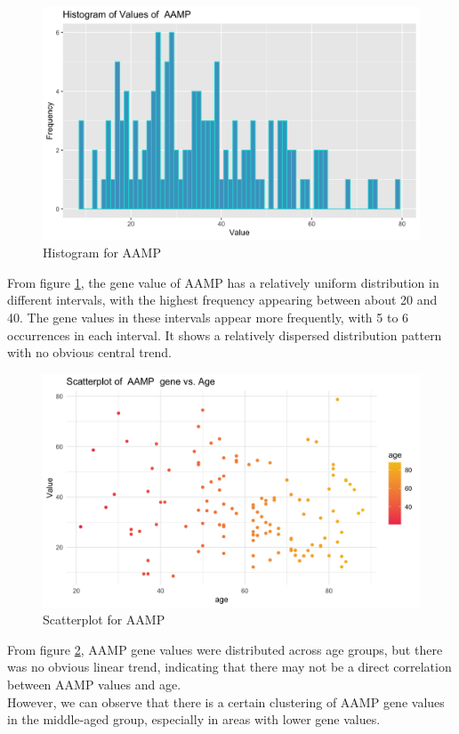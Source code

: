 \documentclass[a4paper, 12pt, one column]{article}
\begin{document}
\begin{figure}[H]
    \centering
    \includegraphics[width=1\textwidth]{hist.png}
    \caption{Histogram for AAMP}
    \label{hist}
\end{figure}
From figure \ref{hist}, the gene value of AAMP has a relatively uniform distribution in different intervals, with the highest frequency appearing between about 20 and 40. The gene values in these intervals appear more frequently, with 5 to 6 occurrences in each interval. It shows a relatively dispersed distribution pattern with no obvious central trend.

\begin{figure}[H]
    \centering
    \includegraphics[width=1\textwidth]{scatter.png} 
    \caption{Scatterplot for AAMP}
    \label{scatter}
\end{figure}
From figure \ref{scatter}, AAMP gene values were distributed across age groups, but there was no obvious linear trend, indicating that there may not be a direct correlation between AAMP values and age.\\
However, we can observe that there is a certain clustering of AAMP gene values in the middle-aged group, especially in areas with lower gene values.
\end{document}
